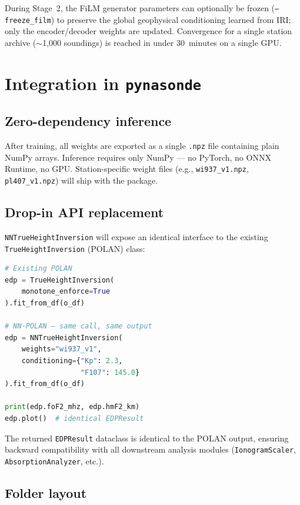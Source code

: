\documentclass[11pt,twocolumn]{article}
\begin{document}
During Stage~2, the FiLM generator parameters can optionally be frozen
(\texttt{--freeze\_film}) to preserve the global geophysical conditioning
learned from IRI; only the encoder/decoder weights are updated.
Convergence for a single station archive ($\sim$1,000 soundings) is reached
in under 30~minutes on a single GPU.

\section{Integration in \texttt{pynasonde}}

\subsection{Zero-dependency inference}

After training, all weights are exported as a single \texttt{.npz} file
containing plain NumPy arrays.
Inference requires only NumPy — no PyTorch, no ONNX Runtime, no GPU.
Station-specific weight files (e.g., \texttt{wi937\_v1.npz},
\texttt{pl407\_v1.npz}) will ship with the package.

\subsection{Drop-in API replacement}

\texttt{NNTrueHeightInversion} will expose an identical interface to the existing
\texttt{TrueHeightInversion} (POLAN) class:

\begin{lstlisting}[language=Python]
# Existing POLAN
edp = TrueHeightInversion(
    monotone_enforce=True
).fit_from_df(o_df)

# NN-POLAN — same call, same output
edp = NNTrueHeightInversion(
    weights="wi937_v1",
    conditioning={"Kp": 2.3,
                  "F107": 145.0}
).fit_from_df(o_df)

print(edp.foF2_mhz, edp.hmF2_km)
edp.plot()  # identical EDPResult
\end{lstlisting}

\noindent
The returned \texttt{EDPResult} dataclass is identical to the POLAN output,
ensuring backward compatibility with all downstream analysis modules
(\texttt{IonogramScaler}, \texttt{AbsorptionAnalyzer}, etc.).

\subsection{Folder layout}
\end{document}

